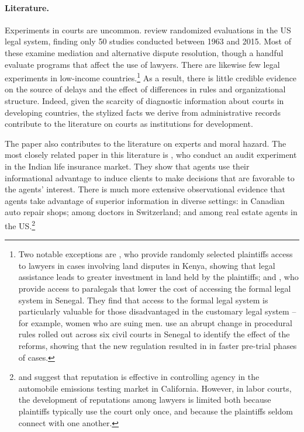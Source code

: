 \documentclass[11pt, a4paper]{article}
\begin{document}
\vspace{.15in}

\paragraph{Literature.} Experiments in courts are uncommon. \cite{Greiner_Matthews_Review2016} review randomized evaluations in the US legal system, finding only 50 studies conducted between 1963 and 2015. Most of these examine mediation and alternative dispute resolution, though a handful evaluate programs that affect the use of lawyers. There are likewise few legal experiments in low-income countries.\footnote{Two notable exceptions are \cite{Chemin_Kenya}, who provide randomly selected plaintiffs access to lawyers in cases involving land disputes in Kenya, showing that legal assistance leads to greater investment in land held by the plaintiffs; and \cite{Sandefur_Siddiqi}, who provide access to paralegals that lower the cost of accessing the formal legal system in Senegal. They find that access to the formal legal system is particularly valuable for those disadvantaged in the customary legal system -- for example, women who are suing men. \cite{Kondylis_Stein_Senegal} use an abrupt change in procedural rules rolled out across six civil courts in Senegal to identify the effect of the reforms, showing that the new regulation resulted in in faster pre-trial phases of cases.} As a result, there is little credible evidence on the source of delays and the effect of differences in rules and organizational structure. Indeed, given the scarcity of diagnostic information about courts in developing countries, the stylized facts we derive from administrative records contribute to the literature on courts as institutions for development.

The paper also contributes to the literature on experts and moral hazard. The most closely related paper in this literature is \cite{anagol_cole_sarkar}, who conduct an audit experiment in the Indian life insurance market. They show that agents use their informational advantage to induce clients to make decisions that are favorable to the agents' interest. There is much more extensive observational evidence that agents take advantage of superior information in diverse settings: \cite{Schneider2012} in Canadian auto repair shops; \cite{emons} among doctors in Switzerland; and \cite{levitt_chad} among real estate agents in the US.\footnote{\cite{hubbard_98} and \cite{hubbard_00} suggest that reputation is effective in controlling agency in the automobile emissions testing market in California. However, in labor courts, the development of reputations among lawyers is limited both because plaintiffs typically use the court only once, and because the plaintiffs seldom connect with one another.} 
\end{document}
